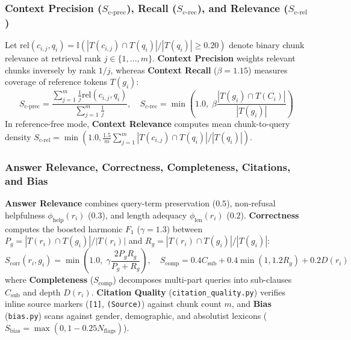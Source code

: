 \documentclass[conference]{IEEEtran}
\begin{document}
\subsubsection{Context Precision ($S_{\text{c-prec}}$), Recall ($S_{\text{c-rec}}$), and Relevance ($S_{\text{c-rel}}$)}
Let $\text{rel}(c_{i,j}, q_i) = \mathbb{I}(|T(c_{i,j}) \cap T(q_i)| / |T(q_i)| \ge 0.20)$ denote binary chunk relevance at retrieval rank $j \in \{1, \dots, m\}$. \textbf{Context Precision} weights relevant chunks inversely by rank $1/j$, whereas \textbf{Context Recall} ($\beta = 1.15$) measures coverage of reference tokens $T(g_i)$:
\begin{equation}
    S_{\text{c-prec}} = \frac{\sum_{j=1}^{m} \frac{1}{j} \text{rel}(c_{i,j}, q_i)}{\sum_{j=1}^{m} \frac{1}{j}}, \quad S_{\text{c-rec}} = \min\left(1.0, \; \beta \frac{|T(g_i) \cap T(C_i)|}{|T(g_i)|}\right)
\end{equation}
In reference-free mode, \textbf{Context Relevance} computes mean chunk-to-query density $S_{\text{c-rel}} = \min(1.0, \frac{1.5}{m} \sum_{j=1}^{m} |T(c_{i,j}) \cap T(q_i)| / |T(q_i)|)$.

\subsubsection{Answer Relevance, Correctness, Completeness, Citations, and Bias}
\textbf{Answer Relevance} combines query-term preservation ($0.5$), non-refusal helpfulness $\phi_{\text{help}}(r_i)$ ($0.3$), and length adequacy $\phi_{\text{len}}(r_i)$ ($0.2$). \textbf{Correctness} computes the boosted harmonic $F_1$ ($\gamma = 1.3$) between $P_g = |T(r_i) \cap T(g_i)| / |T(r_i)|$ and $R_g = |T(r_i) \cap T(g_i)| / |T(g_i)|$:
\begin{equation}
    S_{\text{corr}}(r_i, g_i) = \min\left(1.0, \; \gamma \frac{2 P_g R_g}{P_g + R_g}\right), \quad S_{\text{comp}} = 0.4 C_{\text{sub}} + 0.4 \min(1, 1.2 R_g) + 0.2 D(r_i)
\end{equation}
where \textbf{Completeness} ($S_{\text{comp}}$) decomposes multi-part queries into sub-clauses $C_{\text{sub}}$ and depth $D(r_i)$. \textbf{Citation Quality} (\texttt{citation\_quality.py}) verifies inline source markers (\texttt{[1]}, \texttt{(Source)}) against chunk count $m$, and \textbf{Bias} (\texttt{bias.py}) scans against gender, demographic, and absolutist lexicons ($S_{\text{bias}} = \max(0, 1 - 0.25 N_{\text{flags}})$).
\end{document}
